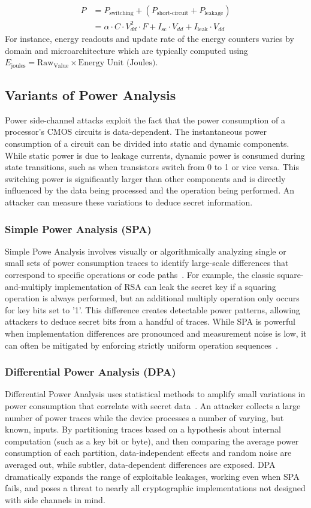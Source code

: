 \begin{align}
P &= P_{\text{switching}} + (P_{\text{short-circuit}} + P_{\text{leakage}}) \nonumber \\
  &= \alpha \cdot C \cdot V_{dd}^2 \cdot F + I_{\text{sc}} \cdot V_{dd} + I_{\text{leak}} \cdot V_{dd}
  \label{eq:Power_Consumption}
\end{align}
For instance, energy readouts and update rate of the energy counters varies by domain and microarchitecture which are typically computed using \( E_{\text{joules}} = \text{Raw}_{\text{Value}} \times \text{Energy Unit (Joules)} \).

\subsection{Variants of Power Analysis}
Power side-channel attacks exploit the fact that the power consumption of a processor’s CMOS circuits is data-dependent. The instantaneous power consumption of a circuit can be divided into static and dynamic components. While static power is due to leakage currents, dynamic power is consumed during state transitions, such as when transistors switch from 0 to 1 or vice versa. This switching power is significantly larger than other components and is directly influenced by the data being processed and the operation being performed. An attacker can measure these variations to deduce secret information.
\subsubsection{Simple Power Analysis (SPA)}
Simple Powe Analysis involves visually or algorithmically analyzing single or small sets of power consumption traces to identify large-scale differences that correspond to specific operations or code paths~\cite{10.1007/3-540-48405-1_2}. For example, the classic square-
and-multiply implementation of RSA can leak the secret key if a squaring operation is always performed, but an additional multiply operation only occurs for key bits set to ’1’. This difference creates detectable power patterns, allowing attackers to deduce secret bits from a handful of traces. While SPA is powerful when implementation differences are pronounced and measurement noise is low, it can often be mitigated by enforcing strictly uniform operation sequences~\cite{10.1007/3-540-48405-1_2}.
\subsubsection{Differential Power Analysis (DPA)}
Differential Power Analysis uses statistical methods to amplify small variations in power consumption that correlate with secret data~\cite{10.1007/3-540-48405-1_2}. An attacker collects a large number of power traces while the device processes a number of varying, but
known, inputs. By partitioning traces based on a hypothesis about internal computation (such as a key bit or byte), and then comparing the average power consumption of each partition, data-independent effects and random noise are averaged out, while subtler, data-dependent differences are exposed. DPA dramatically expands the range
of exploitable leakages, working even when SPA fails, and poses a threat to nearly all 
cryptographic implementations not designed with side channels in mind.
